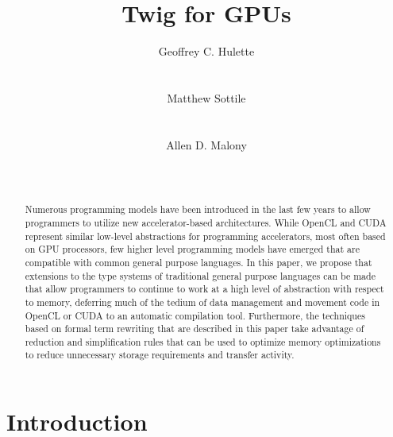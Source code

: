 \documentclass{acm_proc_article-sp}
\begin{document}
\title{Twig for GPUs}


\author{
\alignauthor
Geoffrey C. Hulette\\
\\
\\
\alignauthor
Matthew Sottile\\
\\
\\
\alignauthor
Allen D. Malony\\
\\
\\
}  

\maketitle

\begin{abstract}
Numerous programming models have been introduced in the last few years to allow
programmers to utilize new accelerator-based architectures.  While OpenCL and CUDA
represent similar low-level abstractions for programming accelerators, most often based
on GPU processors, few higher level programming models have emerged that are
compatible with common general purpose languages.  In this paper, we propose that
extensions to the type systems of traditional general purpose languages can be made
that allow programmers to continue to work at a high level of abstraction with respect to memory, 
deferring much
of the tedium of data management and movement code in OpenCL or CUDA to an automatic compilation tool.  
Furthermore, the techniques based on formal term rewriting that are described in this paper take
advantage of reduction and simplification rules that can be used to optimize memory optimizations to reduce
unnecessary storage requirements and transfer activity.
\end{abstract}

\section{Introduction}
\end{document}
